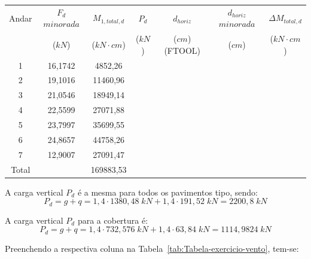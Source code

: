 \begin{table}[H]
\centering
\begin{tabular}{c|c|c|ccc|c}
\hline
Andar & $F_d$ $minorada$ & $M_{1, total, d}$ & \multicolumn{1}{c|}{$P_d$} & \multicolumn{1}{c|}{$d_{horiz}$} & $d_{horiz}$ $minorada$ & $\Delta M_{total, d}$ \\
 & ($kN$) & ($kN\cdot cm$) & \multicolumn{1}{c|}{($kN$)} & \multicolumn{1}{c|}{($cm$) (FTOOL)} & ($cm$) & ($kN\cdot cm$) \\ \hline
1 & 16,1742 & 4852,26 & \multicolumn{1}{c|}{} & \multicolumn{1}{c|}{} &  &  \\
2 & 19,1016 & 11460,96 & \multicolumn{1}{c|}{} & \multicolumn{1}{c|}{} &  &  \\
3 & 21,0546 & 18949,14 & \multicolumn{1}{c|}{} & \multicolumn{1}{c|}{} &  &  \\
4 & 22,5599 & 27071,88 & \multicolumn{1}{c|}{} & \multicolumn{1}{c|}{} &  &  \\
5 & 23,7997 & 35699,55 & \multicolumn{1}{c|}{} & \multicolumn{1}{c|}{} &  &  \\
6 & 24,8657 & 44758,26 & \multicolumn{1}{c|}{} & \multicolumn{1}{c|}{} &  &  \\
7 & 12,9007 & 27091,47 & \multicolumn{1}{c|}{} & \multicolumn{1}{c|}{} &  &  \\ \hline
Total &  & 169883,53 &  &  &  &  \\ \cline{1-1} \cline{3-3} \cline{7-7} 
\end{tabular}
\end{table}

A carga vertical $P_d$ é a mesma para todos os pavimentos tipo, sendo: $$P_d=g+q=1,4\cdot1380,48\;kN+1,4\cdot191,52\;kN=2200,8\;kN$$

A carga vertical $P_d$ para a cobertura é: $$P_d=g+q=1,4\cdot 732,576\;kN+1,4\cdot63,84\;kN=1114,9824\;kN$$

Preenchendo a respectiva coluna na Tabela~\ref{tab:Tabela-exercicio-vento}, tem-se:

